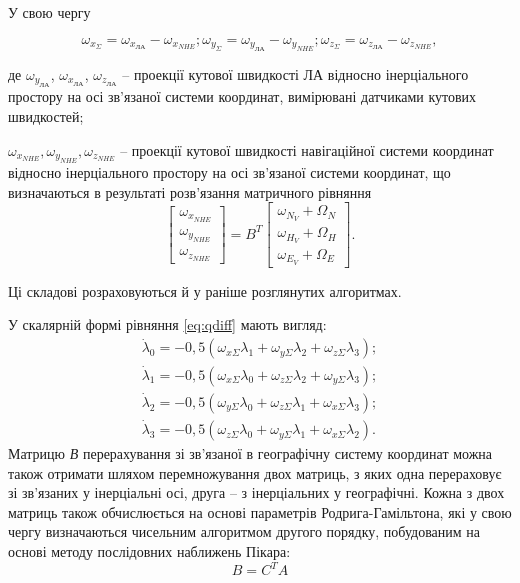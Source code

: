 \begin{ESKDexplanation}
 \item У свою чергу  

\[\omega_{x_{\Sigma } } =\omega_{x_{\text{ЛА}} } -\omega_{x_{NHE} } ;  \omega 
_{y_{\Sigma } } =\omega_{y_{\text{ЛА}} } -\omega_{y_{NHE} } ;  \omega_{z_{\Sigma 
} } =\omega_{z_{\text{ЛА}} } -\omega_{z_{NHE} } ,\] 

де  $\omega_{y_{\text{ЛА}}}$, $\omega_{x_{\text{ЛА}}}$, $\omega_{z_{\text{ЛА}}}$ --
проекції кутової швидкості ЛА відносно інерціального простору на осі 
зв'язаної системи координат, вимірювані датчиками кутових швидкостей;

 \item $\omega_{x_{NHE}} ,\omega_{y_{NHE}} ,\omega_{z_{NHE}} $ -- проекції кутової 
швидкості навігаційної системи координат відносно інерціального простору на осі зв'язаної 
системи координат, що визначаються в результаті розв'язання матричного рівняння 
\[\left[
\begin{array}{c} 
{\omega_{x_{NHE}} } \\ 
{\omega_{y_{NHE}} } \\ 
{\omega_{z_{NHE} }} 
\end{array}\right]=B^{T} 
\left[\begin{array}{c} 
{\omega_{N_{V}} +\Omega_{N}} \\ 
{\omega_{H_{V}} +\Omega_{H}} \\ 
{\omega_{E_{V}} +\Omega_{E}} 
\end{array}\right].\] 
\end{ESKDexplanation}
Ці складові розраховуються й у раніше розглянутих алгоритмах.


У скалярній формі рівняння \eqref{eq:qdiff} мають вигляд:
\[\begin{array}{l} 
{\dot{\lambda }_{0} =-0,5(\omega_{x\Sigma } \lambda_{1} +\omega_{y\Sigma } \lambda_{2} +\omega_{z\Sigma } \lambda_{3} );} \\ 
{\dot{\lambda }_{1} =-0,5(\omega_{x\Sigma } \lambda_{0} +\omega_{z\Sigma } \lambda_{2} +\omega_{y\Sigma } \lambda_{3} );} \\ 
{\dot{\lambda }_{2} =-0,5(\omega_{y\Sigma } \lambda_{0} +\omega_{z\Sigma } \lambda_{1} +\omega_{x\Sigma } \lambda_{3} );} \\ 
{\dot{\lambda }_{3} =-0,5(\omega_{z\Sigma } \lambda_{0} +\omega_{y\Sigma } \lambda_{1} +\omega_{x\Sigma } \lambda_{2} ).} 
\end{array}\] 
Матрицю \textit{В} перерахування зі зв'язаної в географічну систему координат можна 
також отримати шляхом перемножування двох матриць, з яких одна перераховує зі зв'язаних 
у інерціальні осі, друга -- з інерціальних у географічні. Кожна з двох матриць також 
обчислюється на основі параметрів Родрига-Гамільтона, які у свою чергу визначаються 
чисельним алгоритмом другого порядку, побудованим на основі методу послідовних наближень  
Пікара:
\[B=C^{T}A\]

